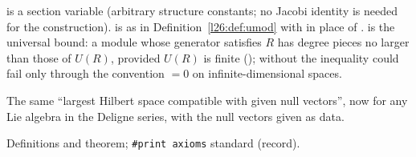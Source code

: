 \begin{dictionary}
 is a section variable (arbitrary structure constants; no Jacobi identity is needed for
the construction).  is as in Definition~\ref{l26:def:umod} with  in place of
.  is the universal bound: a module whose generator satisfies $R$ has degree pieces
no larger than those of $U(R)$, provided $U(R)$ is finite (); without  the inequality could fail only through
the convention $=0$ on infinite-dimensional spaces.
\end{dictionary}

\begin{physics}
The same ``largest Hilbert space compatible with given null vectors'', now for any Lie algebra in the Deligne series, with the
null vectors given as data.
\end{physics}

\begin{status}
Definitions and theorem; \texttt{\#print axioms} standard (record).
\end{status}


